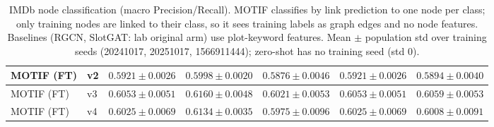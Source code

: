 \documentclass{article}
\begin{document}
\begin{table}[t]
\begin{tabular}{||l||l||c|c|c||c|c||}
\hline
MOTIF (FT) & v2 & $0.5921 \pm 0.0026$ & $0.5998 \pm 0.0020$ & $0.5876 \pm 0.0046$ & $0.5921 \pm 0.0026$ & $0.5894 \pm 0.0040$ \\
\hline
MOTIF (FT) & v3 & $0.6053 \pm 0.0051$ & $0.6160 \pm 0.0048$ & $0.6021 \pm 0.0053$ & $0.6053 \pm 0.0051$ & $0.6059 \pm 0.0053$ \\
\hline
MOTIF (FT) & v4 & $0.6025 \pm 0.0069$ & $0.6134 \pm 0.0035$ & $0.5975 \pm 0.0096$ & $0.6025 \pm 0.0069$ & $0.6008 \pm 0.0091$ \\
\hline
\end{tabular}
\caption{IMDb node classification (macro Precision/Recall). MOTIF classifies by link prediction to one node per class; only training nodes are linked to their class, so it sees training labels as graph edges and no node features. Baselines (RGCN, SlotGAT: lab original arm) use plot-keyword features. Mean $\pm$ population std over training seeds (20241017, 20251017, 1566911444); zero-shot has no training seed (std 0). }
\label{tab:nc_imdb_seed_performance}
\end{table}
\end{document}
